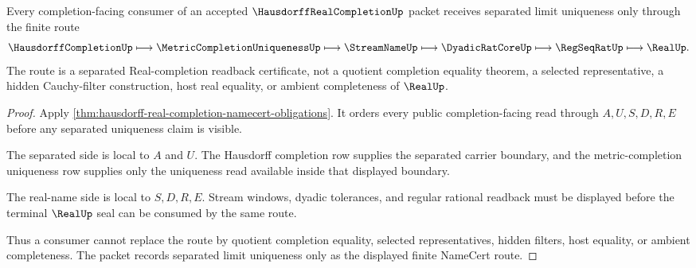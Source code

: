 \begin{theorem}
\label{thm:hausdorff-real-completion-separated-limit-uniqueness}
Every completion-facing consumer of an accepted $\HausdorffRealCompletionUp$ packet receives separated limit uniqueness only through the finite route
$$
\HausdorffCompletionUp \longmapsto \MetricCompletionUniquenessUp \longmapsto \StreamNameUp \longmapsto \DyadicRatCoreUp \longmapsto \RegSeqRatUp \longmapsto \RealUp .
$$
The route is a separated Real-completion readback certificate, not a quotient completion equality theorem, a selected representative, a hidden Cauchy-filter construction, host real equality, or ambient completeness of $\RealUp$.
\end{theorem}
\begin{proof}
Apply \autoref{thm:hausdorff-real-completion-namecert-obligations}. It orders every public completion-facing read through $A,U,S,D,R,E$ before any separated uniqueness claim is visible.

The separated side is local to $A$ and $U$. The Hausdorff completion row supplies the separated carrier boundary, and the metric-completion uniqueness row supplies only the uniqueness read available inside that displayed boundary.

The real-name side is local to $S,D,R,E$. Stream windows, dyadic tolerances, and regular rational readback must be displayed before the terminal $\RealUp$ seal can be consumed by the same route.

Thus a consumer cannot replace the route by quotient completion equality, selected representatives, hidden filters, host equality, or ambient completeness. The packet records separated limit uniqueness only as the displayed finite NameCert route.
\end{proof}

